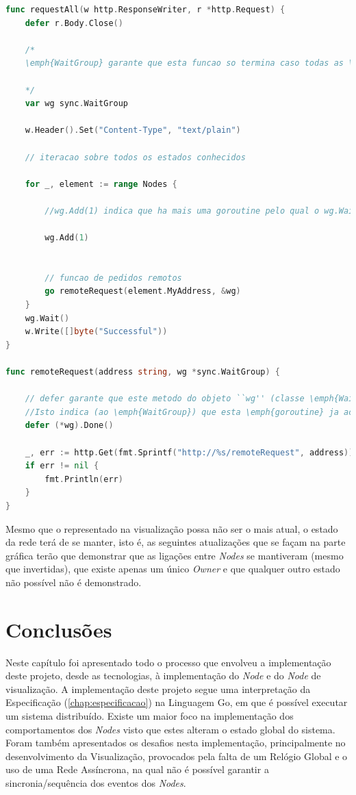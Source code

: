 \begin{lstlisting}[caption={\emph{Handler} ``requestAll'' do método ``/requestAll''},language=Go]
func requestAll(w http.ResponseWriter, r *http.Request) {
	defer r.Body.Close()

	/* 
	\emph{WaitGroup} garante que esta funcao so termina caso todas as \emph{goroutines} terminem de executar.

	*/
	var wg sync.WaitGroup

	w.Header().Set("Content-Type", "text/plain")

	// iteracao sobre todos os estados conhecidos

	for _, element := range Nodes {

		//wg.Add(1) indica que ha mais uma goroutine pelo qual o wg.Wait() precisa de esperar

		wg.Add(1)


		// funcao de pedidos remotos
		go remoteRequest(element.MyAddress, &wg)
	}
	wg.Wait()
	w.Write([]byte("Successful"))
}

func remoteRequest(address string, wg *sync.WaitGroup) {

	// defer garante que este metodo do objeto ``wg'' (classe \emph{WaitGroup}) e executado
	//Isto indica (ao \emph{WaitGroup}) que esta \emph{goroutine} ja acabou a execucao
	defer (*wg).Done()

	_, err := http.Get(fmt.Sprintf("http://%s/remoteRequest", address))
	if err != nil {
		fmt.Println(err)
	}
}

\end{lstlisting}

Mesmo que o representado na visualização possa não ser o mais atual, o estado da rede terá de se manter, isto é, as seguintes 
atualizações que se façam na parte gráfica terão que demonstrar que as ligações entre \emph{Nodes} se mantiveram (mesmo que invertidas), que existe apenas um único \emph{Owner} e que qualquer outro estado não possível não é demonstrado.




\section{Conclusões}

Neste capítulo foi apresentado todo o processo que envolveu a implementação deste projeto, desde as tecnologias, à implementação do \emph{Node} e do \emph{Node} de visualização.
A implementação deste projeto segue uma interpretação da Especificação (\ref{chap:especificacao}) na Linguagem Go, em que é possível executar um sistema distribuído.
Existe um maior foco na implementação dos comportamentos dos \emph{Nodes} visto que estes alteram o estado global do sistema. Foram também apresentados os desafios nesta implementação,
principalmente no desenvolvimento da Visualização, provocados pela falta de um Relógio Global e o uso de uma Rede Assíncrona, na qual não é possível garantir a sincronia/sequência dos eventos dos \emph{Nodes}.


